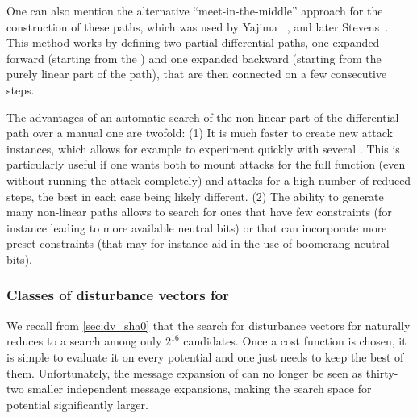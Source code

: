One can also mention the alternative ``meet-in-the-middle'' approach for the construction of these paths, which was used by Yajima \etal~\cite{DBLP:conf/acisp/YajimaSNISKO07},
and later Stevens~\cite{phdstevens}. This method works by defining two partial differential paths, one expanded forward (\eg starting from the \iv) and one expanded backward
(\eg starting from the purely linear part of the path), that are then connected on a few consecutive steps.

The advantages of an automatic search of the non-linear part of the differential path over a manual one are twofold: (1) It is much faster to create new
attack instances, which allows for example to experiment quickly with several \dvs. This is particularly useful if one wants both to mount
attacks for the full function (even without running the attack completely) and attacks for a high number of reduced steps, the best \dvs in each case
being likely different. (2) The ability to generate many non-linear paths allows to search for ones that have few constraints (for instance leading
to more available neutral bits) or that can incorporate more preset constraints (that may for instance aid in the use of boomerang neutral bits).




\subsubsection{Classes of disturbance vectors for \shaone}
\label{sec:sha1_dvs}

We recall from \autoref{sec:dv_sha0} that the search for disturbance vectors for \shazero naturally reduces to a search among only $2^{16}$ candidates. Once a cost function
is chosen, it is simple to evaluate it on every potential \dv and one just needs to keep the best of them. Unfortunately, the message expansion of \shaone can no longer be seen as
thirty-two smaller independent message expansions, making the search space for potential \dvs significantly larger.

